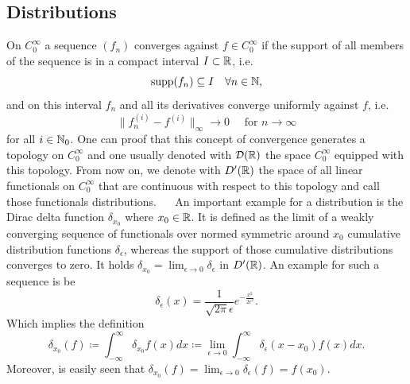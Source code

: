 \subsection*{Distributions}
	On $C_{0}^{\infty}$ a sequence $(f_{n})$ converges against $f \in C_{0}^{\infty}$ if the support of all members of the sequence is in a compact interval $I \subset \mathbb{R}$, i.e.
	$$ \operatorname{supp} (f_{n}) \subseteq I \quad \forall n \in \mathbb{N}, $$
	and on this interval $f_{n}$ and all its derivatives converge uniformly against $f$, i.e.
	\[ \| f_{n}^{(i)} - f^{(i)} \|_{\infty} \rightarrow 0 \quad \text{ for } n \rightarrow \infty \]
	for all $i \in \mathbb{N}_{0}$. One can proof that this concept of convergence generates a topology on $C_{0}^{\infty}$ and one usually denoted with $\mathcal{D}(\mathbb{R})$ the space $C_{0}^{\infty}$ equipped with this topology. From now on, we denote with $D'(\mathbb{R})$ the space of all linear functionals on $C_{0}^{\infty}$ that are continuous with respect to this topology and call those functionals distributions.
~\newline ~\newline
An important example for a distribution is the Dirac delta function $\delta_{x_{0}}$ where $x_{0} \in \mathbb{R}$. It is defined as the limit of a weakly converging sequence of functionals over normed symmetric around $x_{0}$ cumulative distribution functions $\delta_{\epsilon}$, whereas the support of those cumulative distributions converges to zero. It holds $\delta_{x_{0}} = \lim_{\epsilon \rightarrow 0} \delta_{\epsilon}$ in $D'(\mathbb{R})$. An example for such a sequence is be
	\[ \delta_{\epsilon}(x) = \frac{1}{\sqrt{2 \pi} \epsilon} e^{-\frac{x^{2}}{2 \epsilon^{2}}}. \]
Which implies the definition
	\[ \delta_{x_{0}}(f) \coloneqq \int_{-\infty}^{\infty} \delta_{x_{0}} f(x) dx \coloneqq \lim_{\epsilon \rightarrow 0} \int_{-\infty}^{\infty} \delta_{\epsilon}(x - x_{0}) f(x) dx. \]
Moreover, is easily seen that $\delta_{x_{0}}(f) = \lim_{\epsilon \rightarrow 0} \delta_{\epsilon}(f) = f(x_{0})$.
